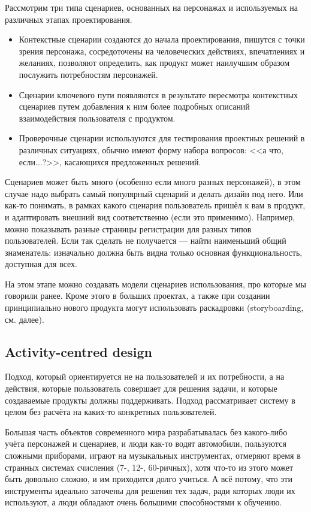 \documentclass{../../text-style}
\begin{document}
Рассмотрим три типа сценариев, основанных на персонажах и используемых на различных этапах проектирования.

\begin{itemize}
    \item Контекстные сценарии создаются до начала проектирования, пишутся с точки зрения персонажа, сосредоточены на человеческих действиях, впечатлениях и желаниях, позволяют определить, как продукт может наилучшим образом послужить потребностям персонажей.
    \item Сценарии ключевого пути появляются в результате пересмотра контекстных сценариев путем добавления к ним более подробных описаний взаимодействия пользователя с продуктом.
    \item Проверочные сценарии используются для тестирования проектных решений в различных ситуациях, обычно имеют форму набора вопросов: <<а что, если...?>>, касающихся предложенных решений.
\end{itemize}

Сценариев может быть много (особенно если много разных персонажей), в этом случае надо выбрать самый популярный сценарий и делать дизайн под него. Или как-то понимать, в рамках какого сценария пользователь пришёл к вам в продукт, и адаптировать внешний вид соответственно (если это применимо). Например, можно показывать разные страницы регистрации для разных типов пользователей. Если так сделать не получается --- найти наименьший общий знаменатель: изначально должна быть видна только основная функциональность, доступная для всех.

На этом этапе можно создавать модели сценариев использования, про которые мы говорили ранее. Кроме этого в больших проектах, а также при создании принципиально нового продукта могут использовать раскадровки (storyboarding, см. далее).

\subsection{Activity-centred design}

Подход, который ориентируется не на пользователей и их потребности, а на действия, которые пользователь совершает для решения задачи, и которые создаваемые продукты должны поддерживать. Подход рассматривает систему в целом без расчёта на каких-то конкретных пользователей.

Большая часть объектов современного мира разрабатывалась без какого-либо учёта персонажей и сценариев, и люди как-то водят автомобили, пользуются сложными приборами, играют на музыкальных инструментах, отмеряют время в странных системах счисления (7-, 12-, 60-ричных), хотя что-то из этого может быть довольно сложно, и им приходится долго учиться. А всё потому, что эти инструменты идеально заточены для решения тех задач, ради которых люди их используют, а люди обладают очень большими способностями к обучению. 
\end{document}
